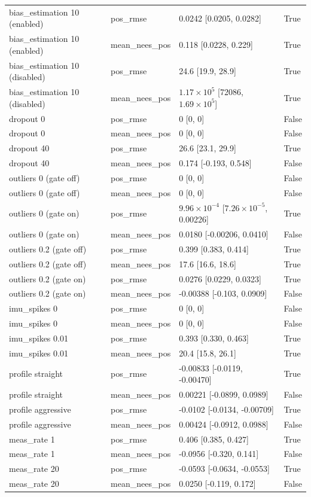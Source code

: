 {\begin{longtable}{llll}
bias\_estimation 10 (enabled) & pos\_rmse & 0.0242 [0.0205, 0.0282] & True \\
bias\_estimation 10 (enabled) & mean\_nees\_pos & 0.118 [0.0228, 0.229] & True \\
bias\_estimation 10 (disabled) & pos\_rmse & 24.6 [19.9, 28.9] & True \\
bias\_estimation 10 (disabled) & mean\_nees\_pos & $1.17\times10^{5}$ [72086, $1.69\times10^{5}$] & True \\
dropout 0 & pos\_rmse & 0 [0, 0] & False \\
dropout 0 & mean\_nees\_pos & 0 [0, 0] & False \\
dropout 40 & pos\_rmse & 26.6 [23.1, 29.9] & True \\
dropout 40 & mean\_nees\_pos & 0.174 [-0.193, 0.548] & False \\
outliers 0 (gate off) & pos\_rmse & 0 [0, 0] & False \\
outliers 0 (gate off) & mean\_nees\_pos & 0 [0, 0] & False \\
outliers 0 (gate on) & pos\_rmse & $9.96\times10^{-4}$ [$7.26\times10^{-5}$, 0.00226] & True \\
outliers 0 (gate on) & mean\_nees\_pos & 0.0180 [-0.00206, 0.0410] & False \\
outliers 0.2 (gate off) & pos\_rmse & 0.399 [0.383, 0.414] & True \\
outliers 0.2 (gate off) & mean\_nees\_pos & 17.6 [16.6, 18.6] & True \\
outliers 0.2 (gate on) & pos\_rmse & 0.0276 [0.0229, 0.0323] & True \\
outliers 0.2 (gate on) & mean\_nees\_pos & -0.00388 [-0.103, 0.0909] & False \\
imu\_spikes 0 & pos\_rmse & 0 [0, 0] & False \\
imu\_spikes 0 & mean\_nees\_pos & 0 [0, 0] & False \\
imu\_spikes 0.01 & pos\_rmse & 0.393 [0.330, 0.463] & True \\
imu\_spikes 0.01 & mean\_nees\_pos & 20.4 [15.8, 26.1] & True \\
profile straight & pos\_rmse & -0.00833 [-0.0119, -0.00470] & True \\
profile straight & mean\_nees\_pos & 0.00221 [-0.0899, 0.0989] & False \\
profile aggressive & pos\_rmse & -0.0102 [-0.0134, -0.00709] & True \\
profile aggressive & mean\_nees\_pos & 0.00424 [-0.0912, 0.0988] & False \\
meas\_rate 1 & pos\_rmse & 0.406 [0.385, 0.427] & True \\
meas\_rate 1 & mean\_nees\_pos & -0.0956 [-0.320, 0.141] & False \\
meas\_rate 20 & pos\_rmse & -0.0593 [-0.0634, -0.0553] & True \\
meas\_rate 20 & mean\_nees\_pos & 0.0250 [-0.119, 0.172] & False \\
\bottomrule
\end{longtable}
}
